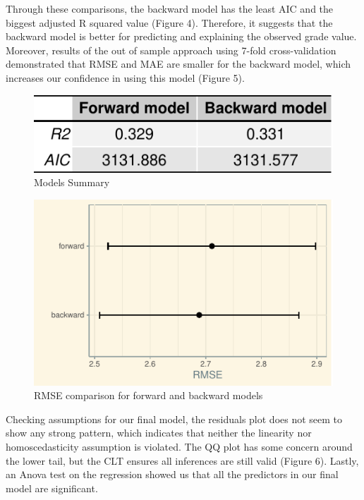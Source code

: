\documentclass[letterpaper,9pt,twocolumn,twoside,]{pinp}
\begin{document}
Through these comparisons, the backward model has the least AIC and the
biggest adjusted R squared value (Figure 4). Therefore, it suggests that
the backward model is better for predicting and explaining the observed
grade value. Moreover, results of the out of sample approach using
7-fold cross-validation demonstrated that RMSE and MAE are smaller for
the backward model, which increases our confidence in using this model
(Figure 5).\linebreak

\begin{figure}[h]
\includegraphics{report_files/figure-latex/unnamed-chunk-4-1} 
\caption{Models Summary}
\end{figure}

\begin{figure}
\includegraphics{report_files/figure-latex/unnamed-chunk-6-1} \caption{RMSE comparison for forward and backward models}\label{fig:unnamed-chunk-6}
\end{figure}

Checking assumptions for our final model, the residuals plot does not
seem to show any strong pattern, which indicates that neither the
linearity nor homoscedasticity assumption is violated. The QQ plot has
some concern around the lower tail, but the CLT ensures all inferences
are still valid (Figure 6). Lastly, an Anova test on the regression
showed us that all the predictors in our final model are
significant.\linebreak
\end{document}
